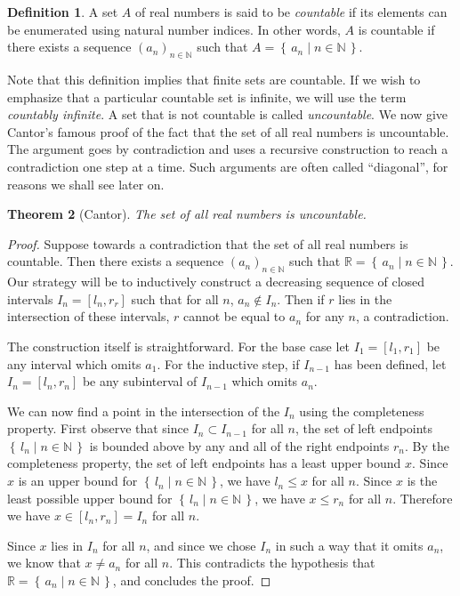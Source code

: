 \documentclass[11pt,oneside]{amsbook}
\newcommand{\set}[1]{\left\{\,#1\,\right\}}
\newcommand{\NN}{\mathbb N}
\newcommand{\RR}{\mathbb R}
\theoremstyle{definition}
\theoremstyle{plain}
\newtheorem{thm}{Theorem}[section]
\theoremstyle{definition}
\newtheorem{defn}[thm]{Definition}
\theoremstyle{remark}
\begin{document}
\begin{defn}
  A set $A$ of real numbers is said to be \emph{countable} if its elements can be enumerated using natural number indices. In other words, $A$ is countable if there exists a sequence $(a_n)_{n\in\NN}$ such that $A=\set{a_n\mid n\in\NN}$.
\end{defn}

Note that this definition implies that finite sets are countable. If we wish to emphasize that a particular countable set is infinite, we will use the term \emph{countably infinite}. A set that is not countable is called \emph{uncountable}. We now give Cantor's famous proof of the fact that the set of all real numbers is uncountable. The argument goes by contradiction and uses a recursive construction to reach a contradiction one step at a time. Such arguments are often called ``diagonal'', for reasons we shall see later on.

\begin{thm}[Cantor]
  \label{thm:cantor}
  The set of all real numbers is uncountable.
\end{thm}

\begin{proof}
  Suppose towards a contradiction that the set of all real numbers is countable. Then there exists a sequence $(a_n)_{n\in\NN}$ such that $\RR=\set{a_n\mid n\in\NN}$. Our strategy will be to inductively construct a decreasing sequence of closed intervals $I_n=[l_n,r_r]$ such that for all $n$, $a_n\notin I_n$. Then if $r$ lies in the intersection of these intervals, $r$ cannot be equal to $a_n$ for any $n$, a contradiction.

The construction itself is straightforward. For the base case let $I_1=[l_1,r_1]$ be any interval which omits $a_1$. For the inductive step, if $I_{n-1}$ has been defined, let $I_n=[l_n,r_n]$ be any subinterval of $I_{n-1}$ which omits $a_n$.

We can now find a point in the intersection of the $I_n$ using the completeness property. First observe that since $I_n\subset I_{n-1}$ for all $n$, the set of left endpoints $\set{l_n\mid n\in\NN}$ is bounded above by any and all of the right endpoints $r_n$. By the completeness property, the set of left endpoints has a least upper bound $x$. Since $x$ is an upper bound for $\set{l_n\mid n\in\NN}$, we have $l_n\leq x$ for all $n$. Since $x$ is the least possible upper bound for $\set{l_n\mid n\in\NN}$, we have $x\leq r_n$ for all $n$. Therefore we have $x\in[l_n,r_n]=I_n$ for all $n$.

Since $x$ lies in $I_n$ for all $n$, and since we chose $I_n$ in such a way that it omits $a_n$, we know that $x\neq a_n$ for all $n$. This contradicts the hypothesis that $\RR=\set{a_n\mid n\in\NN}$, and concludes the proof.
\end{proof}
\end{document}
